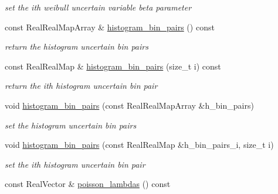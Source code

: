\begin{DoxyCompactItemize}
\begin{DoxyCompactList}\small\item\em set the ith weibull uncertain variable beta parameter \end{DoxyCompactList}\item 
const Real\+Real\+Map\+Array \& \hyperlink{classPecos_1_1AleatoryDistParams_a4a287e379a890c51ee88849beadcf5f9}{histogram\+\_\+bin\+\_\+pairs} () const \label{classPecos_1_1AleatoryDistParams_a4a287e379a890c51ee88849beadcf5f9}

\begin{DoxyCompactList}\small\item\em return the histogram uncertain bin pairs \end{DoxyCompactList}\item 
const Real\+Real\+Map \& \hyperlink{classPecos_1_1AleatoryDistParams_ae5d02fa00baf18c545877ce92cd061e4}{histogram\+\_\+bin\+\_\+pairs} (size\+\_\+t i) const \label{classPecos_1_1AleatoryDistParams_ae5d02fa00baf18c545877ce92cd061e4}

\begin{DoxyCompactList}\small\item\em return the ith histogram uncertain bin pair \end{DoxyCompactList}\item 
void \hyperlink{classPecos_1_1AleatoryDistParams_a0680129dc1520abea9d2bb28e97694dd}{histogram\+\_\+bin\+\_\+pairs} (const Real\+Real\+Map\+Array \&h\+\_\+bin\+\_\+pairs)\label{classPecos_1_1AleatoryDistParams_a0680129dc1520abea9d2bb28e97694dd}

\begin{DoxyCompactList}\small\item\em set the histogram uncertain bin pairs \end{DoxyCompactList}\item 
void \hyperlink{classPecos_1_1AleatoryDistParams_ab3aa3b69f075f5d6a02747dc99962788}{histogram\+\_\+bin\+\_\+pairs} (const Real\+Real\+Map \&h\+\_\+bin\+\_\+pairs\+\_\+i, size\+\_\+t i)\label{classPecos_1_1AleatoryDistParams_ab3aa3b69f075f5d6a02747dc99962788}

\begin{DoxyCompactList}\small\item\em set the ith histogram uncertain bin pair \end{DoxyCompactList}\item 
const Real\+Vector \& \hyperlink{classPecos_1_1AleatoryDistParams_ae00c52588f4525acae6d063819756274}{poisson\+\_\+lambdas} () const \label{classPecos_1_1AleatoryDistParams_ae00c52588f4525acae6d063819756274}


\end{DoxyCompactItemize}
